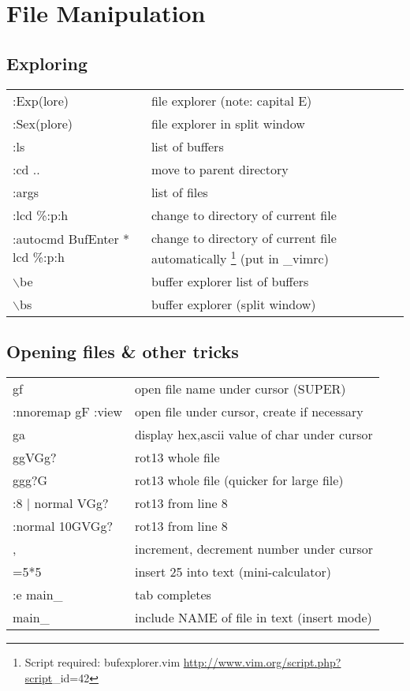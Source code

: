 \section{File Manipulation}

\subsection{Exploring}
\begin{center}
\begin{longtable}{l|l}
 :Exp(lore) & file explorer (note: capital E)\\
 :Sex(plore) & file explorer in split window\\
 :ls & list of buffers\\
 :cd .. & move to parent directory\\
 :args & list of files\\
 :lcd \%:p:h & change to directory of current file\\
 :autocmd BufEnter * lcd \%:p:h & change to directory of current file automatically \footnote{Script required: bufexplorer.vim \url{http://www.vim.org/script.php?script}\_id=42} (put in \_vimrc)\\
 $\backslash$be & buffer explorer list of buffers\\
 $\backslash$bs & buffer explorer (split window)
\end{longtable}
\end{center}

\subsection{Opening files \& other tricks}
\begin{center}
\begin{longtable}{l|l}
 gf & open file name under cursor (SUPER)\\
 :nnoremap gF :view  & open file under cursor, create if necessary\\
 ga & display hex,ascii value of char under cursor\\
 ggVGg? & rot13 whole file\\
 ggg?G & rot13 whole file (quicker for large file)\\
 :8 $|$ normal VGg? & rot13 from line 8\\
 :normal 10GVGg? & rot13 from line 8\\
 , & increment, decrement number under cursor\\
 =5*5 & insert 25 into text (mini-calculator)\\
 :e main\_ & tab completes\\
 main\_ & include NAME of file in text (insert mode)
\end{longtable}
\end{center}

